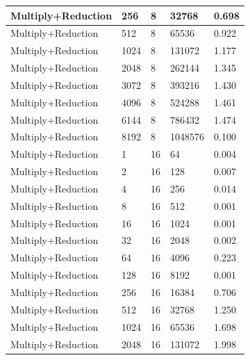 \documentclass{article}
\begin{document}
\begin{longtable}{|l|l|l|l|l|}
Multiply+Reduction & 256  & 8           & 32768             & 0.698             \\ \hline
Multiply+Reduction & 512  & 8           & 65536             & 0.922             \\ \hline
Multiply+Reduction & 1024 & 8           & 131072            & 1.177             \\ \hline
Multiply+Reduction & 2048 & 8           & 262144            & 1.345             \\ \hline
Multiply+Reduction & 3072 & 8           & 393216            & 1.430             \\ \hline
Multiply+Reduction & 4096 & 8           & 524288            & 1.461             \\ \hline
Multiply+Reduction & 6144 & 8           & 786432            & 1.474             \\ \hline
Multiply+Reduction & 8192 & 8           & 1048576           & 0.100             \\ \hline
Multiply+Reduction & 1    & 16          & 64                & 0.004             \\ \hline
Multiply+Reduction & 2    & 16          & 128               & 0.007             \\ \hline
Multiply+Reduction & 4    & 16          & 256               & 0.014             \\ \hline
Multiply+Reduction & 8    & 16          & 512               & 0.001             \\ \hline
Multiply+Reduction & 16   & 16          & 1024              & 0.001             \\ \hline
Multiply+Reduction & 32   & 16          & 2048              & 0.002             \\ \hline
Multiply+Reduction & 64   & 16          & 4096              & 0.223             \\ \hline
Multiply+Reduction & 128  & 16          & 8192              & 0.001             \\ \hline
Multiply+Reduction & 256  & 16          & 16384             & 0.706             \\ \hline
Multiply+Reduction & 512  & 16          & 32768             & 1.250             \\ \hline
Multiply+Reduction & 1024 & 16          & 65536             & 1.698             \\ \hline
Multiply+Reduction & 2048 & 16          & 131072            & 1.998             \\ \hline

\end{longtable}
\end{document}
